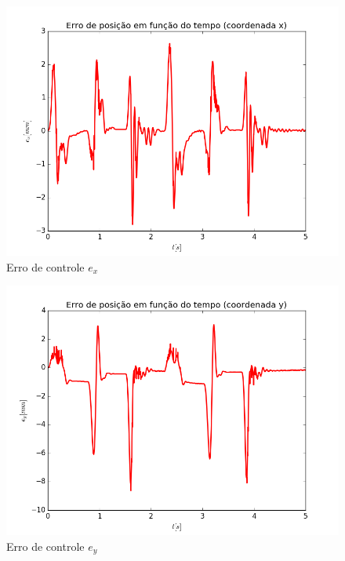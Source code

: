 \documentclass[]{politex}
\begin{document}
\begin{multicols}{2}
\begin{figure}[H]
	\centering
	\includegraphics[scale=0.39]{../../../Experimental/Aquisicoes/PIDSMCx_triangulo/ex.png}  
	\caption{Erro de controle $e_x$}
	\label{fig:PIDSMCx_triangulo_ex}
\end{figure}
\begin{figure}[H]
	\centering
	\includegraphics[scale=0.39]{../../../Experimental/Aquisicoes/PIDSMCx_triangulo/ey.png}  
	\caption{Erro de controle $e_y$}
	\label{fig:PIDSMCx_triangulo_ey}
\end{figure}
\end{multicols}
\end{document}
